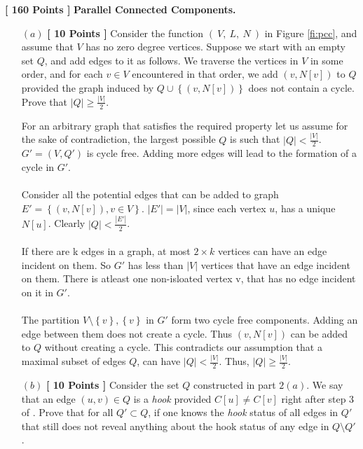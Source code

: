 \documentclass[11pt]{article}
\def\func#1{\textrm{\bf{\sc{#1}}}}
\def\para#1{\vspace{0.2cm}\noindent{\bf{#1.}}}
\begin{document}
\para{Task 2} {\bf{[ 160 Points ]}} {\bf Parallel Connected Components.}
%
 \begin{itemize}

 \item[$(a)$] {\bf{[ 10 Points ]}}
 Consider the function \func{Random-Hook}$(~V, ~L, ~N ~)$ in Figure \ref{fi:pcc},
 and assume that $V$ has no zero degree vertices.
 Suppose we start with an empty set $Q$, and add edges to it as follows.
 We traverse the vertices in $V$ in some order, and for each
 $v \in V$ encountered in that order, we add  $\left( v, N[ v ] \right)$ 
 to $Q$ provided the graph induced
 by $Q \cup \left\{ \left( v, N[ v ] \right) \right\}$ does not
 contain a cycle. Prove that $|Q| \geq \frac{|V|}{2}$.


For an arbitrary graph that satisfies the required property let us assume for the sake of contradiction, the largest possible $Q$ is such that $|Q| < \frac{|V|}{2}$. $G' = (V, Q')$ is cycle free. Adding more edges will lead to the formation of a cycle in $G'$.\\
\\
Consider all the potential edges that can be added to graph $E' = \left\{ \left( v, N[ v ] \right), v \in V \right\}$. $ |E'| = |V|$, since each vertex $u$, has a unique $N[u]$.
Clearly  $|Q| < \frac{|E'|}{2}$.\\
\\
If there are k edges in a graph, at most $2 \times k$ vertices can have an edge incident on them. So $G'$ has less than $|V|$ vertices that have an edge incident on them. There is atleast one non-isloated vertex v, that has no edge incident on it in $G'$.\\
\\
 The partition $V \setminus \left\{v \right\}, \left\{v \right\}$ in $G'$ form two cycle free components. Adding an edge between them does not create a cycle. Thus $\left( v, N[ v ] \right) $ can be added to $Q$ without creating a cycle. This contradicts our assumption that a maximal subset of edges $Q$, can have $|Q| < \frac{|V|}{2}$. Thus, $|Q| \geq \frac{|V|}{2}$.
 \item[$(b)$] {\bf{[ 10 Points ]}} 
 Consider the set $Q$ constructed in part $2(a)$. 
 We say that an edge $\left( u, v \right) \in Q$ is a {\em hook} provided
 $C[ u ] \neq C[ v ]$  right after step 3 of \func{Random-Hook}.
%
  Prove that for all $Q' \subset Q$, 
 if one knows the {\em hook} status of all edges in $Q'$ that
 still does not reveal anything about the hook status
 of any edge in $Q \setminus Q'$.



\end{itemize}
\end{document}

